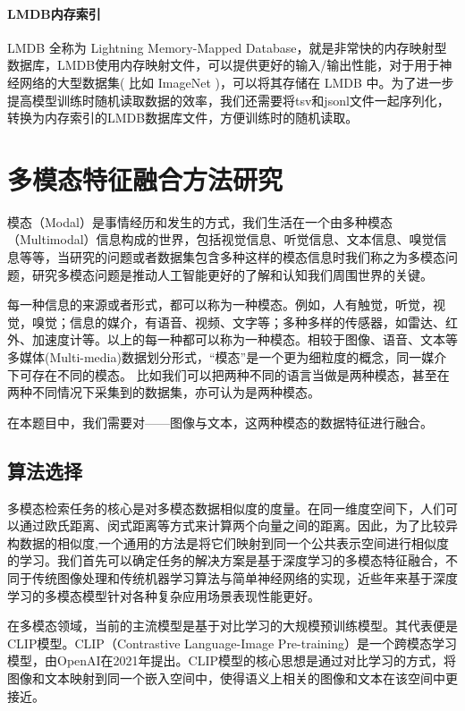 \documentclass[a4paper]{zreport}
\begin{document}
\paragraph{LMDB内存索引}
LMDB 全称为 Lightning Memory-Mapped Database，就是非常快的内存映射型数据库，LMDB使用内存映射文件，可以提供更好的输入/输出性能，对于用于神经网络的大型数据集( 比如 ImageNet )，可以将其存储在 LMDB 中。为了进一步提高模型训练时随机读取数据的效率，我们还需要将tsv和jsonl文件一起序列化，转换为内存索引的LMDB数据库文件，方便训练时的随机读取。

\section{多模态特征融合方法研究}

模态（Modal）是事情经历和发生的方式，我们生活在一个由多种模态（Multimodal）信息构成的世界，包括视觉信息、听觉信息、文本信息、嗅觉信息等等，当研究的问题或者数据集包含多种这样的模态信息时我们称之为多模态问题，研究多模态问题是推动人工智能更好的了解和认知我们周围世界的关键。

每一种信息的来源或者形式，都可以称为一种模态。例如，人有触觉，听觉，视觉，嗅觉；信息的媒介，有语音、视频、文字等；多种多样的传感器，如雷达、红外、加速度计等。以上的每一种都可以称为一种模态。相较于图像、语音、文本等多媒体(Multi-media)数据划分形式，“模态”是一个更为细粒度的概念，同一媒介下可存在不同的模态。 比如我们可以把两种不同的语言当做是两种模态，甚至在两种不同情况下采集到的数据集，亦可认为是两种模态。

在本题目中，我们需要对——图像与文本，这两种模态的数据特征进行融合。

\subsection{算法选择}

多模态检索任务的核心是对多模态数据相似度的度量。在同一维度空间下，人们可以通过欧氏距离、闵式距离等方式来计算两个向量之间的距离。因此，为了比较异构数据的相似度,一个通用的方法是将它们映射到同一个公共表示空间进行相似度的学习。我们首先可以确定任务的解决方案是基于深度学习的多模态特征融合，不同于传统图像处理和传统机器学习算法与简单神经网络的实现，近些年来基于深度学习的多模态模型针对各种复杂应用场景表现性能更好。

在多模态领域，当前的主流模型是基于对比学习的大规模预训练模型。其代表便是CLIP模型。CLIP（Contrastive Language-Image Pre-training）是一个跨模态学习模型\cite{clip}，由OpenAI在2021年提出。CLIP模型的核心思想是通过对比学习的方式，将图像和文本映射到同一个嵌入空间中，使得语义上相关的图像和文本在该空间中更接近。
\end{document}
